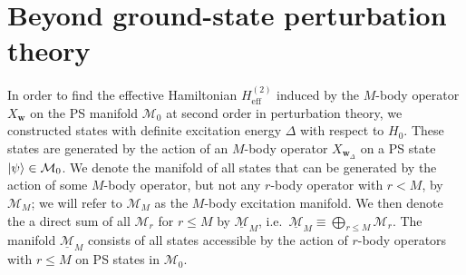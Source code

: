 \documentclass[nofootinbib,notitlepage,11pt]{revtex4-2}
\renewcommand{\t}{\text} %
\newcommand{\m}{\bm} %
\newcommand{\1}{\mathds{1}}
\newcommand{\M}{\mathcal{M}}
\newcommand{\ul}{\underline}
\begin{document}
\section{Beyond ground-state perturbation theory}
\label{eq:excited_states}

In order to find the effective Hamiltonian $H_{\t{eff}}^{(2)}$ induced
by the $M$-body operator $X_{\m w}$ on the PS manifold $\M_0$ at
second order in perturbation theory, we constructed states with
definite excitation energy $\Delta$ with respect to $H_0$.  These
states are generated by the action of an $M$-body operator
$X_{\m w_\Delta}$ on a PS state $\ket\psi\in\M_0$.  We denote the
manifold of all states that can be generated by the action of some
$M$-body operator, but not any $r$-body operator with $r<M$, by
$\M_M$; we will refer to $\M_M$ as the $M$-body excitation manifold.
We then denote the a direct sum of all $\M_r$ for $r\le M$ by
$\ul{\M}_M$, i.e.~$\ul{\M}_M\equiv\bigoplus_{r\le M}\M_r$.  The
manifold $\ul{\M}_M$ consists of all states accessible by the action
of $r$-body operators with $r\le M$ on PS states in $\M_0$.
\end{document}
